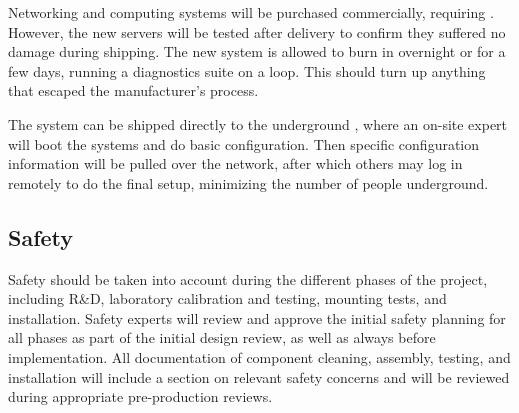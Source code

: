 Networking and computing systems will be purchased commercially, requiring . However, the new servers will be tested after delivery to confirm they suffered no damage during shipping. The new system is allowed to burn in overnight or for a few days, 
running a diagnostics suite on a loop. This should turn up anything that escaped the manufacturer's  process.

The system can be shipped directly to the underground  , 
where an on-site
expert will boot the systems and do basic
configuration. Then specific configuration information will be pulled over
the network, after which others may log in remotely to do the final
setup, minimizing the number of people underground.


\subsection{Safety}
Safety should be taken into account during the different phases of the  project, including R\&D, laboratory calibration and testing, mounting tests, and installation. 
Safety experts will review and approve the initial safety planning for all phases as part of the initial design review, as well as always before implementation. 
All documentation of component cleaning, assembly, testing, and installation will include a section on relevant safety concerns and will be reviewed during appropriate pre-production reviews.

